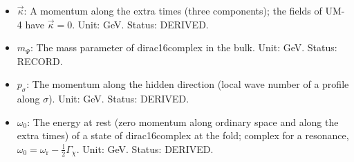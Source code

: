 \documentclass[
  10pt,
]{article}
\begin{document}
\begin{itemize}
  \(\mathrm{e}^{-a_4}b_4\,\mathrm{e}^{-H\lvert\sigma\rvert}\) at the
  distance \(\sigma\) from it (the square root of the warp factor times
  \(\mathrm{e}^{-a_4}b_4\)). Unit: dimensionless. Status: AUTHOR.
\item
  \(\vec\kappa\): A momentum along the extra times (three components);
  the fields of UM-4 have \(\vec\kappa = 0\). Unit: GeV. Status:
  DERIVED.
\item
  \(m_\Psi\): The mass parameter of dirac16complex in the bulk. Unit:
  GeV. Status: RECORD.
\item
  \(p_\sigma\): The momentum along the hidden direction (local wave
  number of a profile along \(\sigma\)). Unit: GeV. Status: DERIVED.
\item
  \(\omega_0\): The energy at rest (zero momentum along ordinary space
  and along the extra times) of a state of dirac16complex at the fold;
  complex for a resonance,
  \(\omega_0 = \omega_{\mathrm{r}} - \frac{\mathrm{i}}{2}\Gamma_\chi\).
  Unit: GeV. Status: DERIVED.
\end{itemize}
\end{document}
